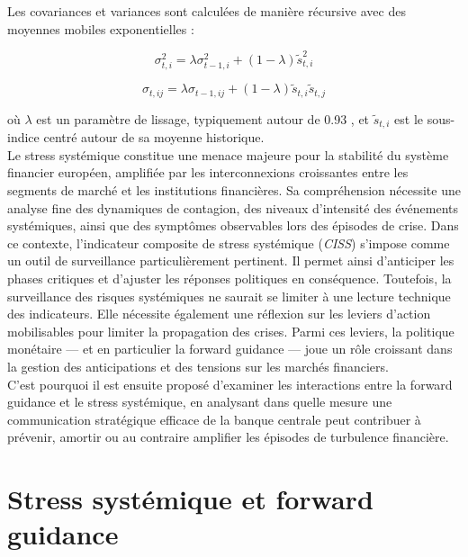 Les covariances et variances sont calculées de manière récursive avec des moyennes mobiles exponentielles :

\begin{equation}
\sigma_{t,i}^2 = \lambda \sigma_{t-1,i}^2 + (1 - \lambda) \tilde{s}_{t,i}^2
\end{equation}

\begin{equation}
\sigma_{t,ij} = \lambda \sigma_{t-1,ij} + (1 - \lambda) \tilde{s}_{t,i} \tilde{s}_{t,j}
\end{equation}

où \( \lambda \) est un paramètre de lissage, typiquement autour de 0.93 \citep{hollo2012ciss}, et \( \tilde{s}_{t,i} \) est le sous-indice centré autour de sa moyenne historique.\\

Le stress systémique constitue une menace majeure pour la stabilité du système financier européen, amplifiée par les interconnexions croissantes entre les segments de marché et les institutions financières. Sa compréhension nécessite une analyse fine des dynamiques de contagion, des niveaux d'intensité des événements systémiques, ainsi que des symptômes observables lors des épisodes de crise. Dans ce contexte, l’indicateur composite de stress systémique (\textit{CISS}) s’impose comme un outil de surveillance particulièrement pertinent. Il permet ainsi d’anticiper les phases critiques et d’ajuster les réponses politiques en conséquence. Toutefois, la surveillance des risques systémiques ne saurait se limiter à une lecture technique des indicateurs. Elle nécessite également une réflexion sur les leviers d’action mobilisables pour limiter la propagation des crises. Parmi ces leviers, la politique monétaire — et en particulier la forward guidance — joue un rôle croissant dans la gestion des anticipations et des tensions sur les marchés financiers.\\

C’est pourquoi il est ensuite proposé d’examiner les interactions entre la forward guidance et le stress systémique, en analysant dans quelle mesure une communication stratégique efficace de la banque centrale peut contribuer à prévenir, amortir ou au contraire amplifier les épisodes de turbulence financière.

\section{Stress systémique et forward guidance}

